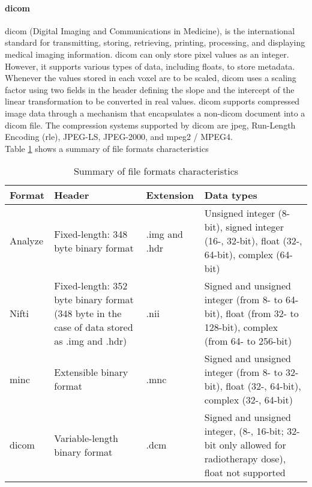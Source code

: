 \paragraph{\acs{dicom}}
\acs{dicom} (Digital Imaging and Communications in Medicine), is the international standard for transmitting, storing, retrieving, printing, processing, and displaying medical imaging information. \acs{dicom} can only store pixel values ​​as an integer. However, it supports various types of data, including floats, to store metadata. Whenever the values ​​stored in each voxel are to be scaled, \acs{dicom} uses a scaling factor using two fields in the header defining the slope and the intercept of the linear transformation to be converted in real values. \acs{dicom} supports compressed image data through a mechanism that encapsulates a non-\acs{dicom} document into a \acs{dicom} file. The compression systems supported by \acs{dicom} are \acs{jpeg}, Run-Length Encoding (\acs{rle}), JPEG-LS, JPEG-2000, and \acs{mpeg}2 / MPEG4.\cite{DIC:1,ME:1}\\
Table \ref{me-file-format} shows a summary of file formats characteristics
\begin{table}[h]
\begin{center}
\begin{tabular}{l p{5cm} l p{5cm}}
\hline
\textbf{Format} & \textbf{Header}                                                                              & \textbf{Extension} & \textbf{Data types}                                                                                     \\ \hline
Analyze & Fixed-length: 348 byte binary format& .img and .hdr & Unsigned integer (8-bit), signed integer (16-, 32-bit), float (32-, 64-bit), complex (64-bit)               \\ \hline
Nifti   & Fixed-length: 352 byte binary format (348 byte in the case of data stored as .img and .hdr) & .nii& Signed and unsigned integer (from 8- to 64-bit), float (from 32- to 128-bit), complex (from 64- to 256-bit) \\ \hline
\acs{minc}    & Extensible binary format & .mnc& Signed and unsigned integer (from 8- to 32-bit), float (32-, 64-bit), complex (32-, 64-bit) \\ \hline
\acs{dicom}    & Variable-length binary format      & .dcm           & Signed and unsigned integer, (8-, 16-bit; 32-bit only allowed for radiotherapy dose), float not supported
\end{tabular}
\caption{Summary of file formats characteristics \cite{ME:1}}
\label{me-file-format}
\end{center}
\end{table}
